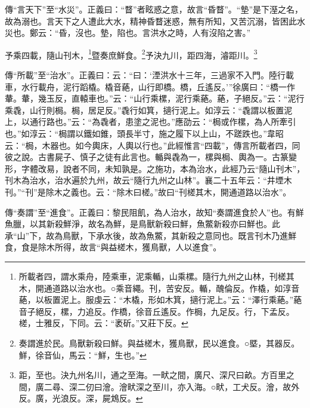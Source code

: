 {\noindent\zhuan{}\fzbyks 傳“言天下”至“水災”。正義曰：“瞀”者眩惑之意，故言“昏瞀”。“墊”是下溼之名，故為溺也。言天下之人遭此大水，精神昏瞀迷惑，無有所知，又苦沉溺，皆困此水災也。鄭云：“昏，沒也。墊，陷也。言洪水之時，人有沒陷之害。” \par}

予乘四載，隨山刊木，\footnote{所載者四，謂水乘舟，陸乘車，泥乘輴，山乘樏。隨行九州之山林，刊槎其木，開通道路以治水也。○乘音繩。刊，苦安反。輴，醜倫反。作橇，如淳音蕝，以板置泥上。服虔云：“木橇，形如木箕，擿行泥上。”云：“澤行乘蕝。”蕝音子絕反，樏，力追反。作橋，徐音丘遙反。作梮，九足反。行，下孟反。槎，士雅反，下同。云：“袤斫。”又莊下反。}暨奏庶鮮食。\footnote{奏謂進於民。鳥獸新殺曰鮮。與益槎木，獲鳥獸，民以進食。○塈，其器反。鮮，徐音仙，馬云：“鮮，生也。”}予決九川，距四海，濬距川。\footnote{距，至也。決九州名川，通之至海。一畎之間，廣尺、深尺曰畝。方百里之間，廣二尋、深二仞曰澮。澮畎深之至川，亦入海。○畎，工犬反。澮，故外反。廣，光浪反。深，屍鴆反。}


{\noindent\zhuan{}\fzbyks 傳“所載”至“治水”。正義曰：云：“曰：‘湮洪水十三年，三過家不入門。陸行載車，水行載舟，泥行蹈橇。橇音蕝，山行即橋。橋，丘遙反。’”徐廣曰：“橋一作輂。輂，幾玉反，直轅車也。”云：“山行乘樏，泥行乘蕝。蕝，子絕反。”云：“泥行乘毳，山行則梮。梮，居足反。”毳行如箕，擿行泥上。如淳云：“毳謂以板置泥上，以通行路也。”云：“為毳者，患塗之泥也。”應劭云：“梮或作樏，為人所牽引也。”如淳云：“梮謂以鐵如錐，頭長半寸，施之履下以上山，不蹉跌也。”韋昭云：“梮，木器也。如今輿床，人輿以行也。”此經惟言“四載”，傳言所載者四，同彼之說。古書屍子、慎子之徒有此言也。輴與毳為一，樏與梮、輿為一。古篆變形，字體改易，說者不同，未知孰是。之施功，本為治水，此經乃云“隨山刊木”，刊木為治水，治水遍於九州，故云“隨行九州之山林”。襄二十五年云：“井堙木刊。”“刊”是除木之義也。云：“除木曰槎。”故曰“刊槎其木，開通道路以治水”。\par}

{\noindent\zhuan{}\fzbyks 傳“奏謂”至“進食”。正義曰：黎民阻飢，為人治水，故知“奏謂進食於人”也。有鮮魚臘，以其新殺鮮淨，故名為鮮，是鳥獸新殺曰鮮，魚鱉新殺亦曰鮮也。此承“山”下，故為鳥獸，下承水後，故為魚鱉，其新殺之意同也。既言刊木乃進鮮食，食是除木所得，故言“與益槎木，獲鳥獸，人以進食”。 \par}

